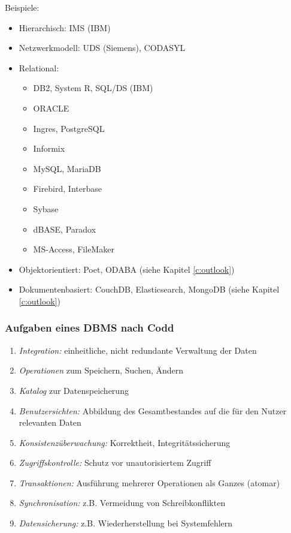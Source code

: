			Beispiele:
			\begin{itemize}
				\item Hierarchisch: IMS (IBM)
				\item Netzwerkmodell: UDS (Siemens), CODASYL
				\item Relational:
					\begin{itemize}
						\item DB2, System R, SQL/DS (IBM)
						\item ORACLE
						\item Ingres, PostgreSQL
						\item Informix
						\item MySQL, MariaDB
						\item Firebird, Interbase
						\item Sybase
						\item dBASE, Paradox
						\item MS-Access, FileMaker
					\end{itemize}
				\item Objektorientiert: Poet, ODABA (siehe Kapitel \ref{c:outlook})
				\item Dokumentenbasiert: CouchDB, Elasticsearch, MongoDB (siehe Kapitel \ref{c:outlook})
			\end{itemize}

			\subsubsection{Aufgaben eines DBMS nach Codd} %
				\begin{enumerate}
					\item \textit{Integration:} einheitliche, nicht redundante Verwaltung der Daten
					\item \textit{Operationen} zum Speichern, Suchen, Ändern
					\item \textit{Katalog} zur Datenspeicherung
					\item \textit{Benutzersichten:} Abbildung des Gesamtbestandes auf die für den Nutzer relevanten Daten
					\item \textit{Konsistenzüberwachung:} Korrektheit, Integritätssicherung
					\item \textit{Zugriffskontrolle:} Schutz vor unautorisiertem Zugriff
					\item \textit{Transaktionen:} Ausführung mehrerer Operationen als Ganzes (atomar)
					\item \textit{Synchronisation:} z.B. Vermeidung von Schreibkonflikten
					\item \textit{Datensicherung:} z.B. Wiederherstellung bei Systemfehlern
				\end{enumerate}

